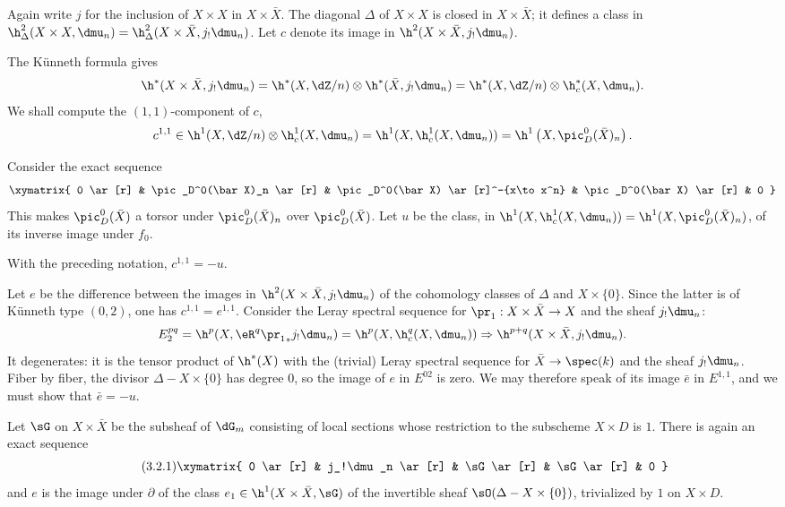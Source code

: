 Again write $j$ for the inclusion of $X\times X$ in $X\times \bar X$. The
diagonal $\Delta$ of $X\times X$ is closed in $X\times \bar X$; it defines a
class in
$\h_\Delta^2(X\times X,\dmu_n)=\h_\Delta^2(X\times \bar X,j_!\dmu_n)$. Let
$c$ denote its image in $\h^2(X\times \bar X,j_!\dmu_n)$.

The K\"unneth formula gives
\[
  \h^*(X\times \bar X,j_!\dmu_n) = \h^*(X,\dZ/n)\otimes \h^*(\bar X,j_!\dmu_n) = \h^*(X,\dZ/n)\otimes \h_c^*(X,\dmu_n) \text{.}
\]
We shall compute the $(1,1)$-component of $c$,
\[
  c^{1,1} \in \h^1(X,\dZ/n)\otimes \h_c^1(X,\dmu_n) = \h^1(X,\h_c^1(X,\dmu_n)) = \h^1\left(X,\pic_D^0(\bar X)_n\right) \text{.}
\]

Consider the exact sequence
\[\xymatrix{
  0 \ar[r]
    & \pic_D^0(\bar X)_n \ar[r]
    & \pic_D^0(\bar X) \ar[r]^-{x\to x^n}
    & \pic_D^0(\bar X) \ar[r]
    & 0
}\]
This makes $\pic_D^0(\bar X)$ a torsor under $\pic_D^0(\bar X)_n$ over
$\pic_D^0(\bar X)$. Let $u$ be the class, in
$\h^1(X,\h_c^1(X,\dmu_n))=\h^1(X,\pic_D^0(\bar X)_n)$, of its inverse image
under $f_0$.


\begin{proposition_}\label{V:3-2}
With the preceding notation, $c^{1,1}=-u$.
\end{proposition_}

Let $e$ be the difference between the images in
$\h^2(X\times \bar X,j_!\dmu_n)$ of the cohomology classes of $\Delta$ and
$X\times\{0\}$. Since the latter is of K\"unneth type $(0,2)$, one has
$c^{1,1}=e^{1,1}$. Consider the Leray spectral sequence for
$\pr_1:X\times \bar X\to X$ and the sheaf $j_!\dmu_n$:
\[
  E_2^{pq} = \h^p(X,\eR^q {\pr_1}_\ast j_!\dmu_n) = \h^p(X,\h_c^q(X,\dmu_n)) \Rightarrow \h^{p+q}(X\times \bar X,j_!\dmu_n) \text{.}
\]
It degenerates: it is the tensor product of $\h^*(X)$ with the
(trivial) Leray spectral sequence for $\bar X\to \spec(k)$ and the sheaf
$j_!\dmu_n$. Fiber by fiber, the divisor $\Delta-X\times\{0\}$ has degree
$0$, so the image of $e$ in $E^{02}$ is zero. We may therefore speak of its
image $\bar e$ in $E^{1,1}$, and we must show that $\bar e = -u$.

Let $\sG$ on $X\times\bar X$ be the subsheaf of $\dG_m$ consisting of local
sections whose restriction to the subscheme $X\times D$ is $1$.
There is again an exact sequence
\begin{equation*}\tag{3.2.1}\label{V:eq:3-2-1}
\xymatrix{
  0 \ar[r]
    & j_!\dmu_n \ar[r]
    & \sG \ar[r]
    & \sG \ar[r]
    & 0
}
\end{equation*}
and $e$ is the image under $\partial$ of the class
$e_1\in \h^1(X\times\bar X,\sG)$ of the invertible sheaf
$\sO(\Delta-X\times\{0\})$, trivialized by $1$ on $X\times D$.

